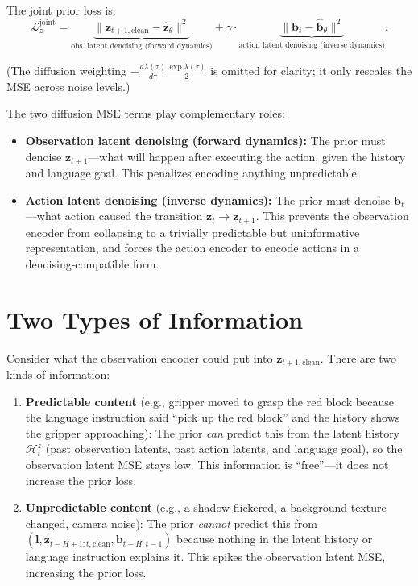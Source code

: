 \documentclass{article}
\newcommand{\vz}{\bm{z}}
\newcommand{\vb}{\bm{b}}
\newcommand{\loss}{\mathcal{L}}
\begin{document}
The joint prior loss is:
\begin{equation}
  \loss_z^{\text{joint}} = \underbrace{\|\vz_{t+1,\text{clean}} - \hat{\vz}_\theta\|^2}_{\text{obs.\ latent denoising (forward dynamics)}} + \gamma \cdot \underbrace{\|\vb_t - \hat{\vb}_\theta\|^2}_{\text{action latent denoising (inverse dynamics)}}.
  \label{eq:joint_prior}
\end{equation}

(The diffusion weighting $-\frac{d\lambda(\tau)}{d\tau}\frac{\exp\lambda(\tau)}{2}$ is omitted for clarity; it only rescales the MSE across noise levels.)

The two diffusion MSE terms play complementary roles:
\begin{itemize}[leftmargin=*]
  \item \textbf{Observation latent denoising (forward dynamics):} The prior must denoise $\vz_{t+1}$---what will happen after executing the action, given the history and language goal. This penalizes encoding anything unpredictable.
  \item \textbf{Action latent denoising (inverse dynamics):} The prior must denoise $\vb_t$---what action caused the transition $\vz_t \to \vz_{t+1}$. This prevents the observation encoder from collapsing to a trivially predictable but uninformative representation, and forces the action encoder to encode actions in a denoising-compatible form.
\end{itemize}

\section{Two Types of Information}

Consider what the observation encoder could put into $\vz_{t+1,\text{clean}}$.
There are two kinds of information:

\begin{enumerate}[leftmargin=*]
  \item \textbf{Predictable content} (e.g., gripper moved to grasp the red block because the language instruction said ``pick up the red block'' and the history shows the gripper approaching):
  The prior \emph{can} predict this from the latent history $\mathcal{H}_t^z$ (past observation latents, past action latents, and language goal), so the observation latent MSE stays low.
  This information is ``free''---it does not increase the prior loss.

  \item \textbf{Unpredictable content} (e.g., a shadow flickered, a background texture changed, camera noise):
  The prior \emph{cannot} predict this from $(\bm{l}, \vz_{t-H+1:t,\text{clean}}, \vb_{t-H:t-1})$ because nothing in the latent history or language instruction explains it.
  This spikes the observation latent MSE, increasing the prior loss.
\end{enumerate}
\end{document}
